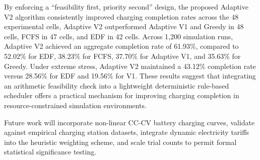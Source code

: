 \documentclass[conference]{IEEEtran}
\begin{document}
By enforcing a ``feasibility first, priority second'' design, the proposed Adaptive V2 algorithm consistently improved charging completion rates across the 48 experimental cells, Adaptive V2 outperformed Adaptive V1 and Greedy in 48 cells, FCFS in 47 cells, and EDF in 42 cells. Across 1,200 simulation runs, Adaptive V2 achieved an aggregate completion rate of 61.93\%, compared to 52.02\% for EDF, 38.23\% for FCFS, 37.70\% for Adaptive V1, and 35.63\% for Greedy. Under extreme stress, Adaptive V2 maintained a 43.12\% completion rate versus 28.56\% for EDF and 19.56\% for V1. These results suggest that integrating an arithmetic feasibility check into a lightweight deterministic rule-based scheduler offers a practical mechanism for improving charging completion in resource-constrained simulation environments.

Future work will incorporate non-linear CC-CV battery charging curves, validate against empirical charging station datasets, integrate dynamic electricity tariffs into the heuristic weighting scheme, and scale trial counts to permit formal statistical significance testing.



\end{document}
